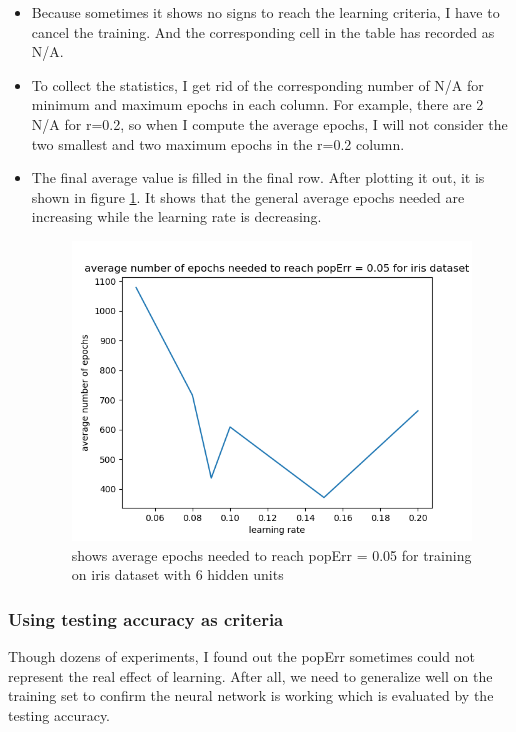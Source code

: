 \documentclass[11pt]{article}
\begin{document}
\begin{itemize}
\item Because sometimes it shows no signs to reach the learning criteria, I have to cancel the training. And the corresponding cell in the table has recorded as N/A.
\item To collect the statistics, I get rid of the corresponding number of N/A for minimum and maximum epochs in each column. For example, there are 2 N/A for r=0.2, so when I compute the average epochs, I will not consider the two smallest and two maximum epochs in the r=0.2 column.
\item The final average value is filled in the final row. After plotting it out, it is shown in figure \ref{fig-average-epochs}. It shows that the general average epochs needed are increasing  while the learning rate is decreasing.
\begin{figure}[htb]
\centering
\includegraphics[width=.9\linewidth]{./average_epochs.png}
\caption{shows average epochs needed to reach popErr = 0.05 for training on iris dataset with 6 hidden units \label{fig-average-epochs}}
\end{figure}
\end{itemize}


\subsubsection{Using testing accuracy as criteria}
\label{sec-3-1-1}
Though dozens of experiments, I found out the popErr sometimes could not represent the real effect of learning. After all, we need to generalize well on the training set to confirm the neural network is working which is evaluated by the testing accuracy.  
\end{document}
